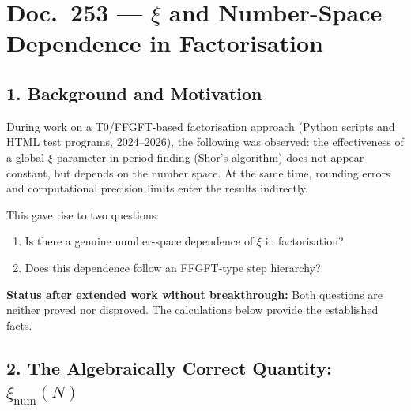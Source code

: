 \section*{Doc.\ 253 — \texorpdfstring{$\xi$}{xi} and Number-Space Dependence in Factorisation}

\begin{abstract}
Working document. Purpose: preservation of results from an extended investigation
without breakthrough. The question investigated was whether the FFGFT parameter
$\xi = 4/30000$ exhibits number-space dependence in the factorisation of composite
integers, and whether this dependence follows an FFGFT-type step hierarchy.
All calculations were verified with Python. The connection to FFGFT remains
a conjecture without an algebraic bridge proof.
\end{abstract}

\subsection*{1. Background and Motivation}

During work on a T0/FFGFT-based factorisation approach (Python scripts and
HTML test programs, 2024--2026), the following was observed: the effectiveness
of a global $\xi$-parameter in period-finding (Shor's algorithm) does not
appear constant, but depends on the number space. At the same time, rounding
errors and computational precision limits enter the results indirectly.

This gave rise to two questions:

\begin{enumerate}
\item Is there a genuine number-space dependence of $\xi$ in factorisation?
\item Does this dependence follow an FFGFT-type step hierarchy?
\end{enumerate}

\begin{mdframed}[style=warn]
\textbf{Status after extended work without breakthrough:} Both questions are
neither proved nor disproved. The calculations below provide the established facts.
\end{mdframed}

\subsection*{2. The Algebraically Correct Quantity: $\xi_\text{num}(N)$}

